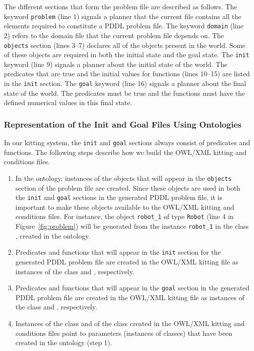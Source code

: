 The different sections that form the problem file are described as follows. The keyword
\texttt{problem} (line 1) signals a planner that the current file contains all the elements
required to constitute a PDDL problem file. The keyword \texttt{domain} (line 2) refers to
the domain file that the current problem file depends on. The \texttt{objects} section (lines 3--7)
declares all of the objects present in the world. Some of these objects are required in both the
initial state and the goal state. The \texttt{init} keyword (line 9) signals a planner about
the initial state of the world. The predicates that are true and the initial values for
functions (lines 10--15) are listed in the \texttt{init} section. The \texttt{goal} keyword
(line 16) signals a planner about the final state of the world. The predicates must be true
and the functions must have the defined numerical values in this final state.


\subsubsection{Representation of the Init and Goal Files Using Ontologies}
In our kitting system, the \texttt{init} and \texttt{goal} sections always consist of
predicates and functions. The following steps describe how we build the OWL/XML kitting
 and  conditions files.
\begin{enumerate}
 \item In the  ontology, instances of the objects that will appear in the
\texttt{objects} section of the problem file are created. Since these objects are used
in both the \texttt{init} and \texttt{goal} sections in the generated PDDL problem file,
it is important to make these objects available to the OWL/XML kitting  and
 conditions files. For instance, the object \texttt{robot\_1} of type
\texttt{Robot} (line 4 in Figure~\ref{fig:problem}) will be generated from the instance
\texttt{robot\_1} in the class , created in the  ontology.
 \item Predicates and functions that will appear in the \texttt{init} section for the
generated PDDL problem file are created in the OWL/XML kitting  file as instances
of the class  and , respectively.
 \item Predicates and functions that will appear in the \texttt{goal} section in the
generated PDDL problem file are created in the OWL/XML kitting  file as
instances of the class  and , respectively.
 \item Instances of the class  and of the class 
created in the OWL/XML kitting  and  conditions files point to parameters (instances of classes) that have been created in the  ontology (step 1).
\end{enumerate}


